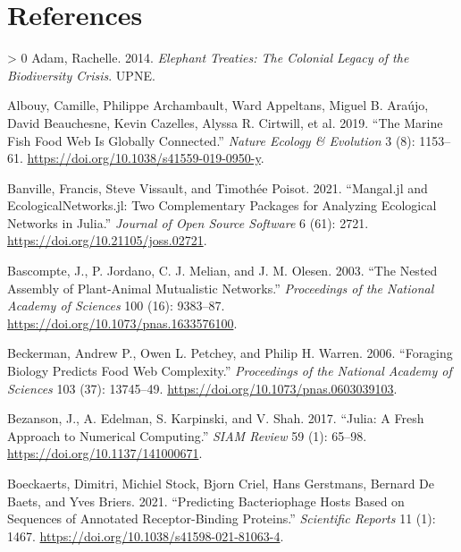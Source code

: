 \documentclass[10pt,oneside]{article}
\newlength{\cslhangindent}
\newenvironment{CSLReferences}[3] %
 {%
  \setlength{\parindent}{0pt}
  \ifodd #1 \everypar{\setlength{\hangindent}{\cslhangindent}}\ignorespaces\fi
  \ifnum #2 > 0
  \setlength{\parskip}{#2\baselineskip}
  \fi
 }%
 {}
\begin{document}
\hypertarget{references}{%
\section*{References}\label{references}}

\hypertarget{refs}{}
\begin{CSLReferences}{1}{0}
\leavevmode\hypertarget{ref-Adam2014EleTre}{}%
Adam, Rachelle. 2014. \emph{Elephant Treaties: The Colonial Legacy of
the Biodiversity Crisis}. UPNE.

\leavevmode\hypertarget{ref-Albouy2019MarFis}{}%
Albouy, Camille, Philippe Archambault, Ward Appeltans, Miguel B. Araújo,
David Beauchesne, Kevin Cazelles, Alyssa R. Cirtwill, et al. 2019.
{``The Marine Fish Food Web Is Globally Connected.''} \emph{Nature
Ecology \& Evolution} 3 (8): 1153--61.
\url{https://doi.org/10.1038/s41559-019-0950-y}.

\leavevmode\hypertarget{ref-Banville2021ManJl}{}%
Banville, Francis, Steve Vissault, and Timothée Poisot. 2021.
{``Mangal.jl and EcologicalNetworks.jl: Two Complementary Packages for
Analyzing Ecological Networks in Julia.''} \emph{Journal of Open Source
Software} 6 (61): 2721. \url{https://doi.org/10.21105/joss.02721}.

\leavevmode\hypertarget{ref-Bascompte2003NesAss}{}%
Bascompte, J., P. Jordano, C. J. Melian, and J. M. Olesen. 2003. {``The
Nested Assembly of Plant-Animal Mutualistic Networks.''}
\emph{Proceedings of the National Academy of Sciences} 100 (16):
9383--87. \url{https://doi.org/10.1073/pnas.1633576100}.

\leavevmode\hypertarget{ref-Beckerman2006ForBio}{}%
Beckerman, Andrew P., Owen L. Petchey, and Philip H. Warren. 2006.
{``Foraging Biology Predicts Food Web Complexity.''} \emph{Proceedings
of the National Academy of Sciences} 103 (37): 13745--49.
\url{https://doi.org/10.1073/pnas.0603039103}.

\leavevmode\hypertarget{ref-Bezanson2017JulFre}{}%
Bezanson, J., A. Edelman, S. Karpinski, and V. Shah. 2017. {``Julia: A
Fresh Approach to Numerical Computing.''} \emph{SIAM Review} 59 (1):
65--98. \url{https://doi.org/10.1137/141000671}.

\leavevmode\hypertarget{ref-Boeckaerts2021PreBac}{}%
Boeckaerts, Dimitri, Michiel Stock, Bjorn Criel, Hans Gerstmans, Bernard
De Baets, and Yves Briers. 2021. {``Predicting Bacteriophage Hosts Based
on Sequences of Annotated Receptor-Binding Proteins.''} \emph{Scientific
Reports} 11 (1): 1467. \url{https://doi.org/10.1038/s41598-021-81063-4}.


\end{CSLReferences}
\end{document}
